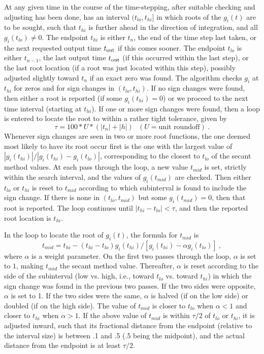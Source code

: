 At any given time in the course of the time-stepping, after suitable
checking and adjusting has been done, {\cvodes} has an interval
$(t_{lo},t_{hi}]$ in which roots of the $g_i(t)$ are to be sought, such
that $t_{hi}$ is further ahead in the direction of integration, and
all $g_i(t_{lo}) \neq 0$.  The endpoint $t_{hi}$ is either $t_n$,
the end of the time step last taken, or the next requested output time
$t_{\mbox{\scriptsize out}}$ if this comes sooner.  The endpoint
$t_{lo}$ is either $t_{n-1}$, the last output time
$t_{\mbox{\scriptsize out}}$ (if this occurred within the last
step), or the last root location (if a root was just located within
this step), possibly adjusted slightly toward $t_n$ if an exact zero
was found.  The algorithm checks $g_i$ at $t_{hi}$ for zeros and for
sign changes in $(t_{lo},t_{hi})$.  If no sign changes were found, then
either a root is reported (if some $g_i(t_{hi}) = 0$) or we proceed to
the next time interval (starting at $t_{hi}$).  If one or more sign
changes were found, then a loop is entered to locate the root to
within a rather tight tolerance, given by
\[ \tau = 100 * U * (|t_n| + |h|)~~~ (U = \mbox{unit roundoff}) ~. \]
Whenever sign changes are seen in two or more root functions, the one
deemed most likely to have its root occur first is the one with the
largest value of $|g_i(t_{hi})|/|g_i(t_{hi}) - g_i(t_{lo})|$,
corresponding to the closest to $t_{lo}$ of the secant method values.
At each pass through the loop, a new value $t_{mid}$ is set, strictly
within the search interval, and the values of $g_i(t_{mid})$ are
checked.  Then either $t_{lo}$ or $t_{hi}$ is reset to $t_{mid}$
according to which subinterval is found to include the sign change.  If
there is none in $(t_{lo},t_{mid})$ but some $g_i(t_{mid}) = 0$, then
that root is reported.  The loop continues until 
$|t_{hi}-t_{lo}| < \tau$, and then the reported root location is
$t_{hi}$.

In the loop to locate the root of $g_i(t)$, the formula for $t_{mid}$
is
\[ t_{mid} = t_{hi} - (t_{hi} - t_{lo})
             g_i(t_{hi}) / [g_i(t_{hi}) - \alpha g_i(t_{lo})] ~, \] 
where $\alpha$ is a weight parameter.  On the first two passes through
the loop, $\alpha$ is set to $1$, making $t_{mid}$ the secant method
value.  Thereafter, $\alpha$ is reset according to the side of the
subinterval (low vs. high, i.e., toward $t_{lo}$ vs. toward $t_{hi}$)
in which the sign change was found in the previous two passes.  If the
two sides were opposite, $\alpha$ is set to 1.  If the two sides were
the same, $\alpha$ is halved (if on the low side) or doubled (if on
the high side).  The value of $t_{mid}$ is closer to $t_{lo}$ when
$\alpha < 1$ and closer to $t_{hi}$ when $\alpha > 1$.  If the above
value of $t_{mid}$ is within $\tau/2$ of $t_{lo}$ or $t_{hi}$, it is
adjusted inward, such that its fractional distance from the endpoint
(relative to the interval size) is between .1 and .5 (.5 being the
midpoint), and the actual distance from the endpoint is at least
$\tau/2$.


